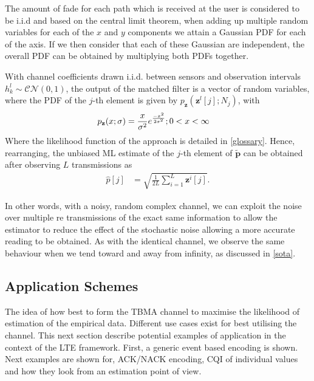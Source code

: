 \documentclass{article}
\begin{document}
The amount of fade for each path which is received at the user is considered to be i.i.d and based on the central limit theorem, when adding up multiple random variables for each of the $x$ and $y$ components we attain a Gaussian PDF for each of the axis. If we then consider that each of these Gaussian are independent, the overall PDF can be obtained by multiplying both PDFs together. 

With channel coefficients drawn \ac{i.i.d}. between sensors and observation intervals $h^l_k \sim \mathcal{CN}(0, 1)$, the output of the matched filter is a vector of random variables, where the \ac{PDF} of the $j$-th element is given by $p_{\mathbf{z}}(\boldsymbol{z}^l[j]; N_j)$, with  
%
\begin{align}
    p_{\mathbf{z}}(x; \sigma) &= \frac{x}{\sigma^2} e^{\frac{-x^2}{2\sigma^2}} ; 
    \newline 0 < x < \infty
\end{align} 
Where the likelihood function of the approach is detailed in \cref{glossary}.
Hence, rearranging, the unbiased ML estimate of the $j$-th element of $\tilde{\boldsymbol{p}}$ can be obtained after observing $L$ transmissions as
%
\begin{align}
    \hat{p}[j] &= \sqrt{\frac{1}{2L} \sum_{i = 1}^{L}\boldsymbol{z}^i[j]}.\label{eq:lte_empf_h_rand}
\end{align}

In other words, with a noisy, random complex channel, we can exploit the noise over multiple re transmissions of the exact same information to allow the estimator to reduce the effect of the stochastic noise allowing a more accurate reading to be obtained. As with the identical channel, we observe the same behaviour when we tend toward and away from infinity, as discussed in \cref{sota}.

\subsection{Application Schemes} \label{schemas_and_channels}
The idea of how best to form the TBMA channel to maximise the likelihood of estimation of the empirical data. Different use cases exist for best utilising the channel. This next section describe potential examples of application in the context of the LTE framework. First, a generic event based encoding is shown. Next examples are shown for, ACK/NACK encoding, \ac{CQI} of individual values and how they look from an estimation point of view.
\end{document}
